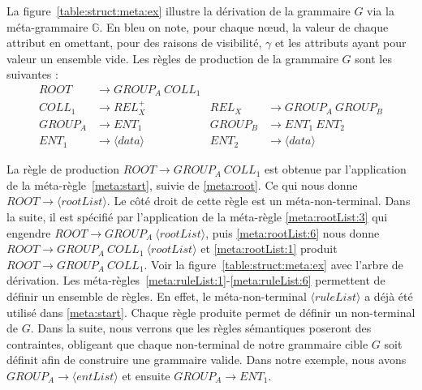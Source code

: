 \begin{example}
    \label{ex:struct:meta}
    La figure~\ref{table:struct:meta:ex} illustre la dérivation de la grammaire $G$ via la méta-grammaire $\mathbb{G}$.
    En bleu on note, pour chaque nœud, la valeur de chaque attribut en omettant, pour des raisons de visibilité, $\gamma$ et les attributs ayant pour valeur un ensemble vide.
    Les règles de production de la grammaire $G$ sont les suivantes :
    \begin{align*}
        ROOT    & \to GROUP_A ~ COLL_1                                          \\
        COLL_1  & \to REL_X^+              & REL_X   & \to GROUP_A ~ GROUP_B    \\
        GROUP_A & \to ENT_1                & GROUP_B & \to ENT_1 ~ ENT_2        \\
        ENT_1   & \to \langle data \rangle & ENT_2   & \to \langle data \rangle
    \end{align*}

    La règle de production $ROOT \rightarrow GROUP_A ~ COLL_1$ est obtenue par l'application de la méta-règle~\ref{meta:start}, suivie de \ref{meta:root}.
    Ce qui nous donne $ROOT \rightarrow \langle rootList \rangle$.
    Le côté droit de cette règle est un méta-non-terminal.
    Dans la suite, il est spécifié par l'application de la méta-règle \ref{meta:rootList:3} qui engendre $ROOT \rightarrow GROUP_A ~ \langle rootList \rangle$, puis \ref{meta:rootList:6} nous donne $ROOT \rightarrow GROUP_A ~ COLL_1 ~ \langle rootList \rangle$ et \ref{meta:rootList:1} produit $ROOT \rightarrow GROUP_A ~ COLL_1$.
    Voir la figure~\ref{table:struct:meta:ex} avec l'arbre de dérivation.
    Les méta-règles~\ref{meta:ruleList:1}-\ref{meta:ruleList:6} permettent de définir un ensemble de règles.
    En effet, le méta-non-terminal $\langle ruleList \rangle$ a déjà été utilisé dans \ref{meta:start}.
    Chaque règle produite permet de définir un non-terminal de $G$.
    Dans la suite, nous verrons que les règles sémantiques poseront des contraintes, obligeant que chaque non-terminal de notre grammaire cible $G$ soit définit afin de construire une grammaire valide.
    Dans notre exemple, nous avons $GROUP_A \rightarrow  \langle entList \rangle$ et ensuite $GROUP_A \rightarrow ENT_1$.
\end{example}


